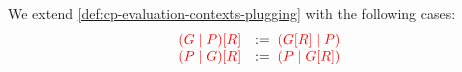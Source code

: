 \begin{definition}[Plugging]\label{def:nc-evaluation-contexts-plugging}
  We extend \cref{def:cp-evaluation-contexts-plugging} with the following cases:
  \begin{gather*}
    \begin{array}{ll}
      \textcolor{red}{{(G \mid P)}[{R}]}
      & := \; \textcolor{red}{({G}[{R}] \mid P)}
      \\
      \textcolor{red}{{(P \mid G)}[{R}]}
      & := \; \textcolor{red}{(P \mid {G}[{R}])}
    \end{array}
  \end{gather*}
\end{definition}
